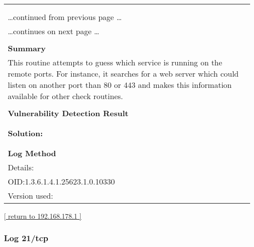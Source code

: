 \documentclass{article}
\begin{document}
\begin{longtable}{|p{}|}
\hline
\rowcolor{gvm_log}{\color{white}{Log (CVSS: 0.0) }}\\
\rowcolor{gvm_log}{\color{white}{NVT: Services}}\\
\hline
\endfirsthead
\hfill\ldots continued from previous page \ldots \\
\hline
\endhead
\hline
\ldots continues on next page \ldots \\
\endfoot
\hline
\endlastfoot
\\
\textbf{Summary}\\
This routine attempts to guess which service is running on the
  remote ports. For instance, it searches for a web server which could listen on another port than
  80 or 443 and makes this information available for other check routines.\\

        \hline
        \\
\textbf{Vulnerability Detection Result}\\
\rowcolor{white}{\verb=A web server is running on this port=}\\

          \hline
          \\
\textbf{Solution:}\\
\\


        \hline
        \\
\textbf{Log Method}\\
Details:
\rowcolor{white}{\verb=Services=}\\
OID:1.3.6.1.4.1.25623.1.0.10330\\
Version used:
\rowcolor{white}{\verb=2021-03-15T10:42:03Z=}\\
\end{longtable}

\begin{footnotesize}\hyperref[host:192.168.178.1]{[ return to 192.168.178.1 ]}\end{footnotesize}
\subsubsection{Log 21/tcp}
\label{port:192.168.178.1 21/tcp Log}
\end{document}
